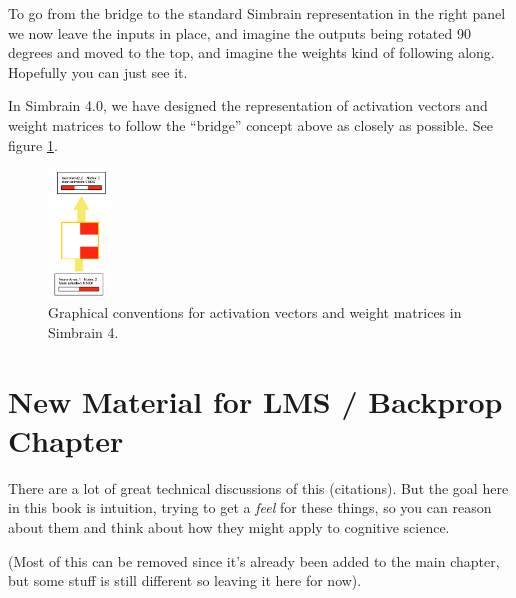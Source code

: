 To go from the bridge to the standard Simbrain representation in the right panel we now leave the inputs in place, and imagine the outputs being rotated 90 degrees and moved to the top, and imagine the weights kind of following along. Hopefully you can just see it. 

In Simbrain 4.0, we have designed the representation of activation vectors and weight matrices to follow the ``bridge'' concept above as closely as possible.  See figure \ref{simbrain4_ff23}.

\begin{figure}[h]
\centering
\includegraphics[width=0.15\textwidth]{images/simbrain4_ff_2_3.png}
\caption[Jeff Yoshimi.]{Graphical conventions for activation vectors and weight matrices in Simbrain 4. }
\label{simbrain4_ff23}
\end{figure}
%
%
%

\section{New Material for LMS / Backprop Chapter}

There are a lot of great technical discussions of this (citations). But the goal here in this book is intuition, trying to get a \emph{feel} for these things, so you can reason about them and think about how they might apply to cognitive science. 

(Most of this can be removed since it's already been added to the main chapter, but some stuff is still different so leaving it here for now).

